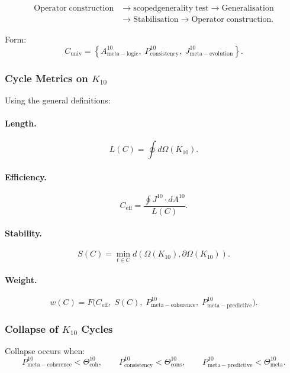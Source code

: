 \[
  \begin{aligned}
  \mathrm{Operator\;construction}
  &\to \mathrm{scoped generality\;test}
  \to \mathrm{Generalisation}\\
  &\to \mathrm{Stabilisation}
  \to \mathrm{Operator\;construction}.
  \end{aligned}
\]

Form:
\[
  C_{\mathrm{univ}}
  =
  \left\{
    A^{10}_{\mathrm{meta\!-\!logic}},\;
    P^{10}_{\mathrm{consistency}},\;
    J^{10}_{\mathrm{meta\!-\!evolution}}
  \right\}.
\]


\subsubsection{Cycle Metrics on $K_{10}$}

Using the general definitions:

\paragraph{Length.}
\[
  L(C) = \oint d\Omega(K_{10}).
\]

\paragraph{Efficiency.}
\[
  C_{\mathrm{eff}} =
  \frac{\oint J^{10}\cdot dA^{10}}{L(C)}.
\]

\paragraph{Stability.}
\[
  S(C)
   = \min_{t\in C}
     d(\Omega(K_{10}), \partial\Omega(K_{10})).
\]

\paragraph{Weight.}
\[
  w(C)
    = F\big(
        C_{\mathrm{eff}},\;
        S(C),\;
        P^{10}_{\mathrm{meta\!-\!coherence}},\;
        P^{10}_{\mathrm{meta\!-\!predictive}}
      \big).
\]


\subsubsection{Collapse of $K_{10}$ Cycles}

Collapse occurs when:
\[
  P^{10}_{\mathrm{meta\!-\!coherence}} < \Theta^{10}_{\mathrm{coh}},\qquad
  P^{10}_{\mathrm{consistency}} < \Theta^{10}_{\mathrm{cons}},\qquad
  P^{10}_{\mathrm{meta\!-\!predictive}} < \Theta^{10}_{\mathrm{meta}}.
\]

